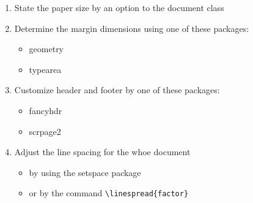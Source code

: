 \documentclass{article}
\begin{document}
\begin{enumerate}
\item State the paper size by an option to the document class
\item Determine the margin dimensions using one of these packages:

\begin{itemize}
	\item geometry
	\item typearea
\end{itemize}
\item Customize header and footer by one of these packages:
\begin{itemize}
	\item fancyhdr
	\item scrpage2
\end{itemize}
\item Adjust the line spacing for the whoe document
\begin{itemize}
	\item by using the setspace package
	\item or by the command \verb|\linespread{factor}|
\end{itemize}

\end{enumerate}
\end{document}
